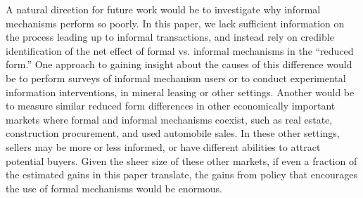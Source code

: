 \documentclass[12pt]{article}
\begin{document}
A natural direction for future work would be to investigate why informal mechanisms perform so poorly. In this paper, we lack sufficient information on the process leading up to informal transactions, and instead rely on credible identification of the net effect of formal vs. informal mechanisms in the ``reduced form.''  One approach to gaining insight about the causes of this difference would be to perform surveys of informal mechanism users or to conduct experimental information interventions, in mineral leasing or other settings.  Another would be to measure similar reduced form differences in other economically important markets where formal and informal mechanisms coexist, such as real estate, construction procurement, and used automobile sales. In these other settings, sellers may be more or less informed, or have different abilities to attract potential buyers. Given the sheer size of these other markets, if even a fraction of the estimated gains in this paper translate, the gains from policy that encourages the use of formal mechanisms would be enormous.  

\singlespace




\pagebreak
\end{document}
